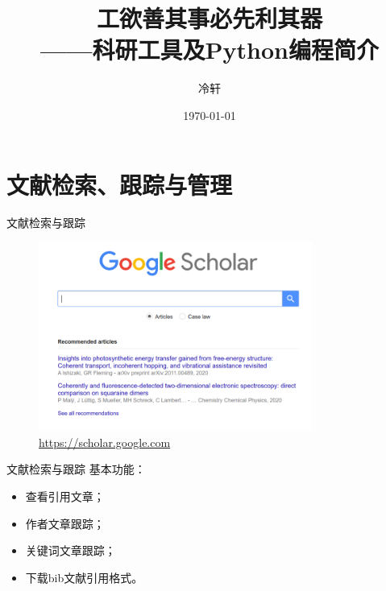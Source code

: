 \documentclass[xcolor=x11names,compress,10pt]{ctexbeamer}
\title{工欲善其事必先利其器\\——{\kai 科研工具及Python编程简介}}
\author{冷轩}
\institute
{
}
\date{\today}
\begin{document}
\maketitle

\newcommand\blfootnote[1]{%
\begingroup 
\renewcommand\thefootnote{}\footnote{#1}%
\addtocounter{footnote}{-1}%
\endgroup 
}

\newenvironment{shrinkeq}[1]%
{ \bgroup
  \addtolength\abovedisplayshortskip{#1}
  \addtolength\abovedisplayskip{#1}
  \addtolength\belowdisplayshortskip{#1}
  \addtolength\belowdisplayskip{#1}}
{\egroup\ignorespacesafterend}




\section[文献]{文献检索、跟踪与管理}
\begin{frame}{文献检索与跟踪}
\begin{figure}[htbp]
\centering
\includegraphics[width=0.8\textwidth]{pictures/1.png}
\caption{\url{https://scholar.google.com} }
\end{figure}
\end{frame}


\begin{frame}{文献检索与跟踪}
基本功能：
\begin{itemize}
\item 查看引用文章；
\item 作者文章跟踪；
\item 关键词文章跟踪；
\item 下载bib文献引用格式。
\end{itemize}
\end{frame}
\end{document}
